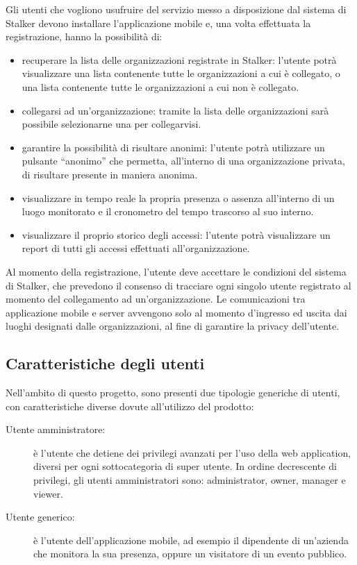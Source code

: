 \documentclass[../manuale-utente.tex]{subfiles}
\begin{document}
Gli utenti che vogliono usufruire del servizio messo a disposizione dal sistema di Stalker devono installare l'applicazione mobile e, una volta effettuata la registrazione, hanno la possibilità di:
\begin{itemize}
  \item recuperare la lista delle organizzazioni registrate in Stalker: l'utente potrà visualizzare una lista contenente tutte le organizzazioni a cui è collegato, o una lista contenente tutte le organizzazioni a cui non è collegato.
  \item collegarsi ad un'organizzazione: tramite la lista delle organizzazioni sarà possibile selezionarne una per collegarvisi.
  \item garantire la possibilità di risultare anonimi: l'utente potrà utilizzare un pulsante “anonimo” che permetta, all'interno di una organizzazione privata, di risultare presente in maniera anonima.
  \item visualizzare in tempo reale la propria presenza o assenza all'interno di un luogo monitorato e il cronometro del tempo trascorso al suo interno.
  \item visualizzare il proprio storico degli accessi: l'utente potrà visualizzare un report di tutti gli accessi effettuati all'organizzazione.

\end{itemize}
Al momento della registrazione, l'utente deve accettare le condizioni del sistema di Stalker, che prevedono il consenso di tracciare ogni singolo utente registrato al momento del collegamento ad un'organizzazione.
Le comunicazioni tra applicazione mobile e server avvengono solo al momento d'ingresso ed uscita dai luoghi designati dalle organizzazioni, al fine di garantire la privacy dell'utente.


\subsection{Caratteristiche degli utenti}%
\label{sub:caratteristiche_degli_utenti}
Nell'ambito di questo progetto, sono presenti due tipologie generiche di utenti, con caratteristiche diverse dovute all'utilizzo del prodotto:
\begin{description}
  \item[Utente amministratore:] è l'utente che detiene dei privilegi avanzati per l'uso della web application, diversi per ogni sottocategoria di super utente. In ordine decrescente di privilegi, gli utenti amministratori sono: administrator, owner, manager e viewer.
  \item[Utente generico:] è l'utente dell'applicazione mobile, ad esempio il dipendente di un'azienda che monitora la sua presenza, oppure un visitatore di un evento pubblico.
\end{description}
\end{document}
